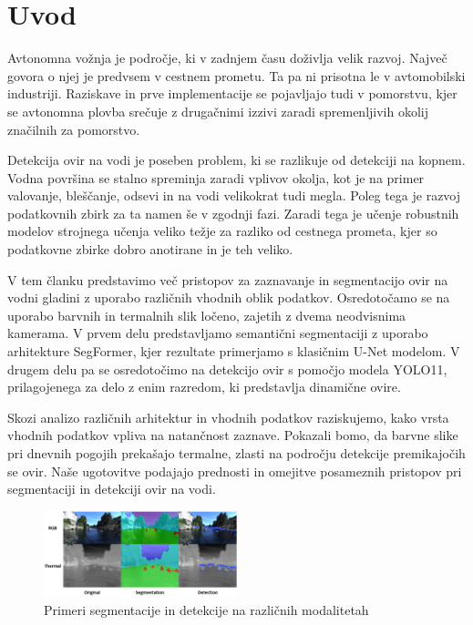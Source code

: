 \documentclass[10pt,twocolumn,letterpaper]{article}
\begin{document}
\section{Uvod}

Avtonomna vožnja je področje, ki v zadnjem času doživlja velik razvoj. Največ govora o njej je predvsem v cestnem prometu. Ta pa ni prisotna le v avtomobilski industriji. Raziskave in prve implementacije se pojavljajo tudi v pomorstvu, kjer se avtonomna plovba srečuje z drugačnimi izzivi zaradi spremenljivih okolij značilnih za pomorstvo.

Detekcija ovir na vodi je poseben problem, ki se razlikuje od detekciji na kopnem. Vodna površina se stalno spreminja zaradi vplivov okolja, kot je na primer valovanje, bleščanje, odsevi in na vodi velikokrat tudi megla. Poleg tega je razvoj podatkovnih zbirk za ta namen še v zgodnji fazi. Zaradi tega je učenje robustnih modelov strojnega učenja veliko težje za razliko od cestnega prometa, kjer so podatkovne zbirke dobro anotirane in je teh veliko.

V tem članku predstavimo več pristopov za zaznavanje in segmentacijo ovir na vodni gladini z uporabo različnih vhodnih oblik podatkov. Osredotočamo se na uporabo barvnih in termalnih slik ločeno, zajetih z dvema neodvisnima kamerama. V prvem delu predstavljamo semantični segmentaciji z uporabo arhitekture SegFormer, kjer rezultate primerjamo s klasičnim U-Net modelom. V drugem delu pa se osredotočimo na detekcijo ovir s pomočjo modela YOLO11, prilagojenega za delo z enim razredom, ki predstavlja dinamične ovire.

Skozi analizo različnih arhitektur in vhodnih podatkov raziskujemo, kako vrsta vhodnih podatkov vpliva na natančnost zaznave. Pokazali bomo, da barvne slike pri dnevnih pogojih prekašajo termalne, zlasti na področju detekcije premikajočih se ovir. Naše ugotovitve podajajo prednosti in omejitve posameznih pristopov pri segmentaciji in detekciji ovir na vodi. 

\begin{figure}[t]
    \centering %
    \includegraphics[width=0.5\textwidth]{Slike/teaser.PNG} %
    \caption{Primeri segmentacije in detekcije na različnih modalitetah} %
    \label{fig:teasere_slika} %
\end{figure}
\end{document}
